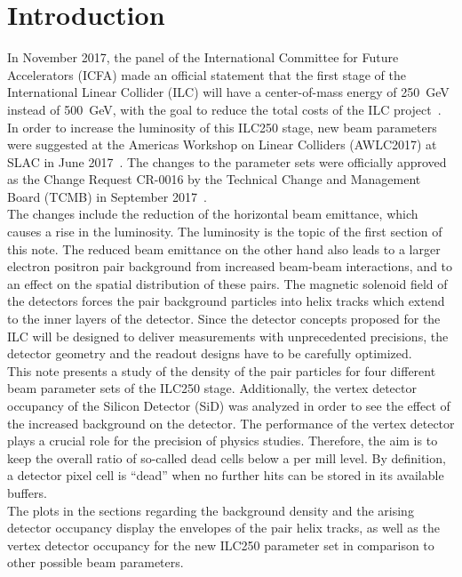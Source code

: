 \documentclass[12pt]{article}
\begin{document}
\section{Introduction}
\label{sec:introduction}
In November 2017, the panel of the International Committee for Future Accelerators (ICFA) made an official statement that the first stage of the International Linear Collider (ILC) will have a center-of-mass energy of \SI{250}{\GeV} instead of \SI{500}{\GeV}, with the goal to reduce the total costs of the ILC project~\cite{ICFA_Statement}.
In order to increase the luminosity of this ILC250 stage, new beam parameters were suggested at the Americas Workshop on Linear Colliders (AWLC2017) at SLAC in June 2017~\cite{AWLC_Yokoya, AWLC_Jeans}.
The changes to the parameter sets were officially approved as the Change Request CR-0016 by the Technical Change and Management Board (TCMB) in September 2017~\cite{CR-0016}.\\
The changes include the reduction of the horizontal beam emittance, which causes a rise in the luminosity.
The luminosity is the topic of the first section of this note.
The reduced beam emittance on the other hand also leads to a larger electron positron pair background from increased beam-beam interactions, and to an effect on the spatial distribution of these pairs.
The magnetic solenoid field of the detectors forces the pair background particles into helix tracks which extend to the inner layers of the detector.
Since the detector concepts proposed for the ILC will be designed to deliver measurements with unprecedented precisions, the detector geometry and the readout designs have to be carefully optimized.\\
This note presents a study of the density of the \Pep\Pem pair particles for four different beam parameter sets of the ILC250 stage.
Additionally, the vertex detector occupancy of the Silicon Detector (SiD) was analyzed in order to see the effect of the increased background on the detector.  
The performance of the vertex detector plays a crucial role for the precision of physics studies.
Therefore, the aim is to keep the overall ratio of so-called dead cells below a per mill level.
By definition, a detector pixel cell is ``dead'' when no further hits can be stored in its available buffers.\\
The plots in the sections regarding the background density and the arising detector occupancy display the envelopes of the pair helix tracks, as well as the vertex detector occupancy for the new ILC250 parameter set in comparison to other possible beam parameters.
\end{document}
